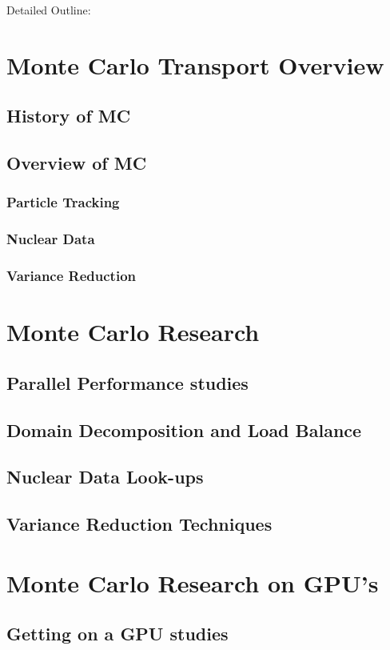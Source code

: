 Detailed Outline:
%
\section{Monte Carlo Transport Overview}
	\subsection{History of MC}

	\subsection{Overview of MC}
		\subsubsection{Particle Tracking}
		\subsubsection{Nuclear Data}
		\subsubsection{Variance Reduction}
	
\section{Monte Carlo Research}
	\subsection{Parallel Performance studies}
	\subsection{Domain Decomposition and Load Balance}
	\subsection{Nuclear Data Look-ups }
	\subsection{Variance Reduction Techniques}

\section{Monte Carlo Research on GPU's}
	\subsection{Getting on a GPU studies}
